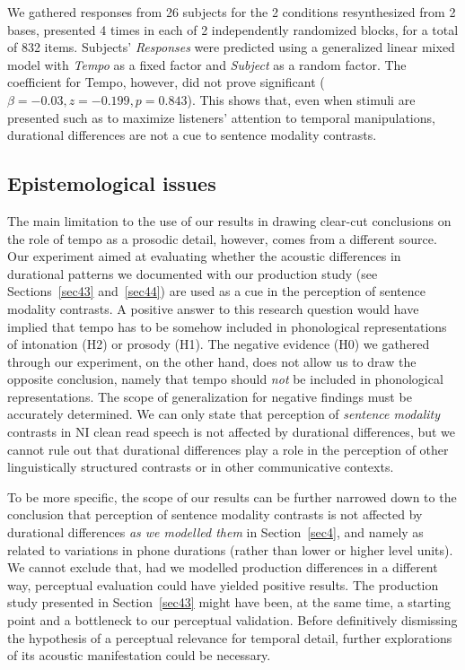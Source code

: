 We gathered responses from 26 subjects for the 2 conditions resynthesized from 2 bases, presented 4 times in each of 2 independently randomized blocks, for a total of 832 items. Subjects' \textit{Responses} were predicted using a generalized linear mixed model with \textit{Tempo} as a fixed factor and \textit{Subject} as a random factor. The coefficient for Tempo, however, did not prove significant ($\beta=-0.03, z=-0.199, p=0.843$). This shows that, even when stimuli are presented such as to maximize listeners' attention to temporal manipulations, durational differences are not a cue to sentence modality contrasts.

\subsection{Epistemological issues}\label{sec542}
The main limitation to the use of our results in drawing clear-cut conclusions on the role of tempo as a prosodic detail, however, comes from a different source. Our experiment aimed at evaluating whether the acoustic differences in durational patterns we documented with our production study (see Sections~\ref{sec43} and~\ref{sec44}) are used as a cue in the perception of sentence modality contrasts. A positive answer to this research question would have implied that tempo has to be somehow included in phonological representations of intonation (H2) or prosody (H1). The negative evidence (H0) we gathered through our experiment, on the other hand, does not allow us to draw the opposite conclusion, namely that tempo should \textit{not} be included in phonological representations. The scope of generalization for negative findings must be accurately determined. We can only state that perception of \textit{sentence modality} contrasts in NI clean read speech is not affected by durational differences, but we cannot rule out that durational differences play a role in the perception of other linguistically structured contrasts or in other communicative contexts. 

To be more specific, the scope of our results can be further narrowed down to the conclusion that perception of sentence modality contrasts is not affected by durational differences \textit{as we modelled them} in Section~\ref{sec4}, and namely as related to variations in phone durations (rather than lower or higher level units). We cannot exclude that, had we modelled production differences in a different way, perceptual evaluation could have yielded positive results. The production study presented in Section~\ref{sec43} might have been, at the same time, a starting point and a bottleneck to our perceptual validation. Before definitively dismissing the hypothesis of a perceptual relevance for temporal detail, further explorations of its acoustic manifestation could be necessary.

